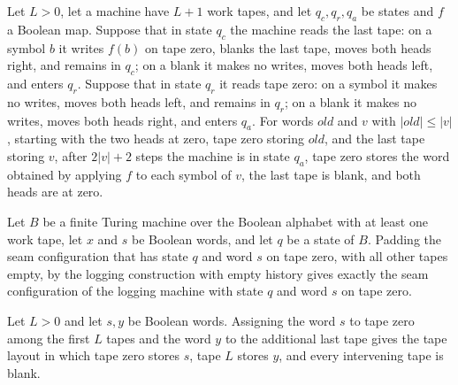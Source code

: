 \begin{lemma}
\label{Complexity.enumCont_copy_complete}
\leanok
{}
Let $L>0$, let a machine have $L+1$ work tapes, and let $q_c,q_r,q_a$ be states and $f$
a Boolean map. Suppose that in state $q_c$ the machine reads the last tape: on a symbol
$b$ it writes $f(b)$ on tape zero, blanks the last tape, moves both heads right, and
remains in $q_c$; on a blank it makes no writes, moves both heads left, and enters
$q_r$. Suppose that in state $q_r$ it reads tape zero: on a symbol it makes no writes,
moves both heads left, and remains in $q_r$; on a blank it makes no writes, moves both
heads right, and enters $q_a$. For words $\mathit{old}$ and $v$ with $|\mathit{old}|\le
|v|$, starting with the two heads at zero, tape zero storing $\mathit{old}$, and the
last tape storing $v$, after $2|v|+2$ steps the machine is in state $q_a$, tape zero
stores the word obtained by applying $f$ to each symbol of $v$, the last tape is blank,
and both heads are at zero.
\end{lemma}

\begin{lemma}
\label{Complexity.enumCont_log_words}
\leanok
{}
Let $B$ be a finite Turing machine over the Boolean alphabet with at least one work
tape, let $x$ and $s$ be Boolean words, and let $q$ be a state of $B$. Padding the seam
configuration that has state $q$ and word $s$ on tape zero, with all other tapes empty,
by the logging construction with empty history gives exactly the seam configuration of
the logging machine with state $q$ and word $s$ on tape zero.
\end{lemma}

\begin{lemma}
\label{Complexity.enumCont_extend_words}
\leanok
{}
Let $L>0$ and let $s,y$ be Boolean words. Assigning the word $s$ to tape zero among the
first $L$ tapes and the word $y$ to the additional last tape gives the tape layout in
which tape zero stores $s$, tape $L$ stores $y$, and every intervening tape is blank.
\end{lemma}

